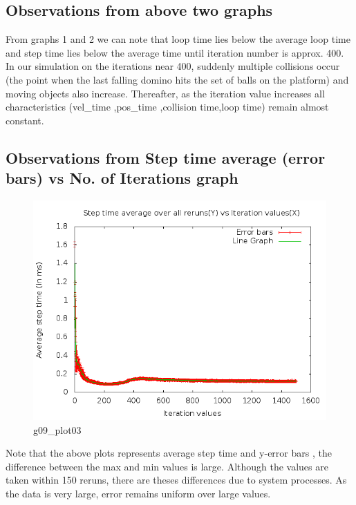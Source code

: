 \documentclass[11pt,english]{article}
\begin{document}
\subsection{Observations from above two graphs}
\indent 
\par{From graphs 1 and 2 we can note that loop time lies below the average loop time and step time lies below the average time until iteration number is approx. 400. In our simulation on the iterations near 400, suddenly multiple collisions occur (the point when the last falling domino hits the set of balls on the platform) and moving objects also increase. Thereafter, as the iteration value increases all characteristics (vel\_time ,pos\_time ,collision time,loop time)  remain almost constant.}

\subsection{Observations from Step time average (error bars) vs No. of Iterations graph}
\begin{figure}[h!]
\centering
\includegraphics[scale=.45]{g09_plot03.png}
\caption{g09\_plot03}
\end{figure}
\indent 
\par{Note that the above plots represents average step time and y-error bars , the difference between the max and min values is large. Although the values are taken within 150 reruns, there are theses differences due to system processes. As the data is very large, error remains uniform over large values.}
\end{document}
